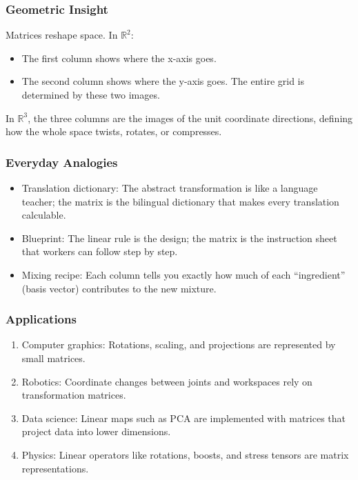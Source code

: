 \documentclass[
  letterpaper,
  DIV=11,
  numbers=noendperiod]{scrreprt}
\providecommand{\tightlist}{%
  \setlength{\itemsep}{0pt}\setlength{\parskip}{0pt}}
\begin{document}
\subsubsection{Geometric Insight}\label{geometric-insight}

Matrices reshape space. In \(\mathbb{R}^2\):

\begin{itemize}
\tightlist
\item
  The first column shows where the x-axis goes.
\item
  The second column shows where the y-axis goes. The entire grid is
  determined by these two images.
\end{itemize}

In \(\mathbb{R}^3\), the three columns are the images of the unit
coordinate directions, defining how the whole space twists, rotates, or
compresses.

\subsubsection{Everyday Analogies}\label{everyday-analogies-38}

\begin{itemize}
\tightlist
\item
  Translation dictionary: The abstract transformation is like a language
  teacher; the matrix is the bilingual dictionary that makes every
  translation calculable.
\item
  Blueprint: The linear rule is the design; the matrix is the
  instruction sheet that workers can follow step by step.
\item
  Mixing recipe: Each column tells you exactly how much of each
  ``ingredient'' (basis vector) contributes to the new mixture.
\end{itemize}

\subsubsection{Applications}\label{applications-5}

\begin{enumerate}
\def\labelenumi{\arabic{enumi}.}
\tightlist
\item
  Computer graphics: Rotations, scaling, and projections are represented
  by small matrices.
\item
  Robotics: Coordinate changes between joints and workspaces rely on
  transformation matrices.
\item
  Data science: Linear maps such as PCA are implemented with matrices
  that project data into lower dimensions.
\item
  Physics: Linear operators like rotations, boosts, and stress tensors
  are matrix representations.
\end{enumerate}
\end{document}
